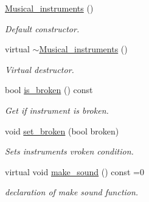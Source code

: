 \begin{DoxyCompactItemize}
\item 
\hyperlink{classMusical__instruments_a978b49b026576ec52455fb2d113d8c29}{Musical\+\_\+instruments} ()
\begin{DoxyCompactList}\small\item\em Default constructor. \end{DoxyCompactList}\item 
virtual \hyperlink{classMusical__instruments_a3dfb7ff46813515a4364e16889ac9e80}{$\sim$\+Musical\+\_\+instruments} ()
\begin{DoxyCompactList}\small\item\em Virtual destructor. \end{DoxyCompactList}\item 
bool \hyperlink{classMusical__instruments_a1207c698fafc339c0dbcb8788826c1ce}{is\+\_\+broken} () const \hypertarget{classMusical__instruments_a1207c698fafc339c0dbcb8788826c1ce}{}\label{classMusical__instruments_a1207c698fafc339c0dbcb8788826c1ce}

\begin{DoxyCompactList}\small\item\em Get if instrument is broken. \end{DoxyCompactList}\item 
void \hyperlink{classMusical__instruments_a5e71161ed85332573902652e41400032}{set\+\_\+broken} (bool broken)\hypertarget{classMusical__instruments_a5e71161ed85332573902652e41400032}{}\label{classMusical__instruments_a5e71161ed85332573902652e41400032}

\begin{DoxyCompactList}\small\item\em Sets instruments vroken condition. \end{DoxyCompactList}\item 
virtual void \hyperlink{classMusical__instruments_ace676c6043eb1335023c02cd547b0ab9}{make\+\_\+sound} () const =0\hypertarget{classMusical__instruments_ace676c6043eb1335023c02cd547b0ab9}{}\label{classMusical__instruments_ace676c6043eb1335023c02cd547b0ab9}

\begin{DoxyCompactList}\small\item\em declaration of make sound function. \end{DoxyCompactList}\end{DoxyCompactItemize}
